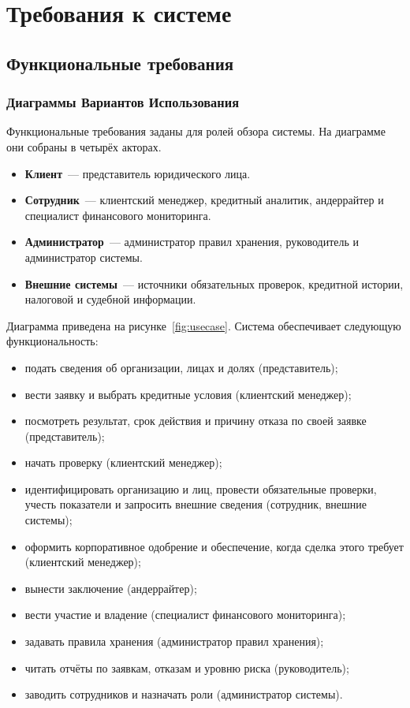 \section{Требования к системе}

\subsection{Функциональные требования}

\subsubsection{Диаграммы Вариантов Использования}

Функциональные требования заданы для ролей обзора системы. На диаграмме они собраны в четырёх акторах.

\begin{itemize}
\item \textbf{Клиент}~--- представитель юридического лица.
\item \textbf{Сотрудник}~--- клиентский менеджер, кредитный аналитик, андеррайтер и специалист финансового мониторинга.
\item \textbf{Администратор}~--- администратор правил хранения, руководитель и администратор системы.
\item \textbf{Внешние системы}~--- источники обязательных проверок, кредитной истории, налоговой и судебной информации.
\end{itemize}

Диаграмма приведена на рисунке~\ref{fig:usecase}. Система обеспечивает следующую функциональность:

\begin{itemize}
\item подать сведения об организации, лицах и долях (представитель);
\item вести заявку и выбрать кредитные условия (клиентский менеджер);
\item посмотреть результат, срок действия и причину отказа по своей заявке (представитель);
\item начать проверку (клиентский менеджер);
\item идентифицировать организацию и лиц, провести обязательные проверки, учесть показатели и запросить внешние сведения (сотрудник, внешние системы);
\item оформить корпоративное одобрение и обеспечение, когда сделка этого требует (клиентский менеджер);
\item вынести заключение (андеррайтер);
\item вести участие и владение (специалист финансового мониторинга);
\item задавать правила хранения (администратор правил хранения);
\item читать отчёты по заявкам, отказам и уровню риска (руководитель);
\item заводить сотрудников и назначать роли (администратор системы).
\end{itemize}

